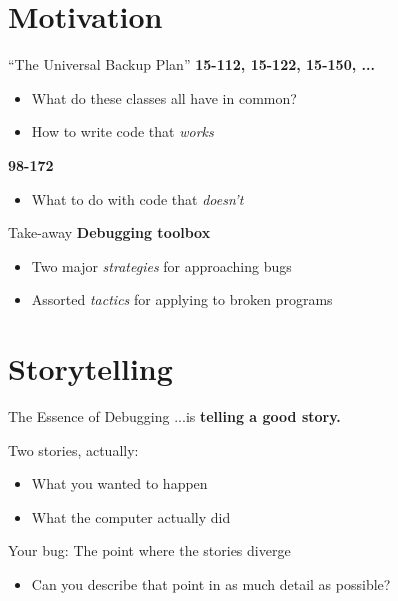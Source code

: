 \documentclass[xcolor=dvipsnames]{beamer}
\begin{document}
\section{Motivation}

\begin{frame}{``The Universal Backup Plan''}
	\textbf{15-112, 15-122, 15-150, ...}
	\begin{itemize}
		\item What do these classes all have in common?
		\pause
		\item How to write code that {\em works}
	\end{itemize}
	\pause
	{\bf 98-172}
	\begin{itemize}
		\item What to do with code that {\em doesn't}
	\end{itemize}
\end{frame}

\begin{frame}{Take-away}
	\textbf{Debugging toolbox}
	\begin{itemize}
		\item Two major {\em strategies} for approaching bugs
		\item Assorted {\em tactics} for applying to broken programs
	\end{itemize}
\end{frame}


\section{Storytelling}

\begin{frame}{The Essence of Debugging}
	...is {\bf telling a good story.}
	\pause
	\linegap

	Two stories, actually:
	\begin{itemize}
		\item What you wanted to happen
		\item What the computer actually did
	\end{itemize}
	\pause
	Your bug: The point where the stories diverge
	\begin{itemize}
		\item Can you describe that point in as much detail as possible?
	\end{itemize}
\end{frame}
\end{document}
